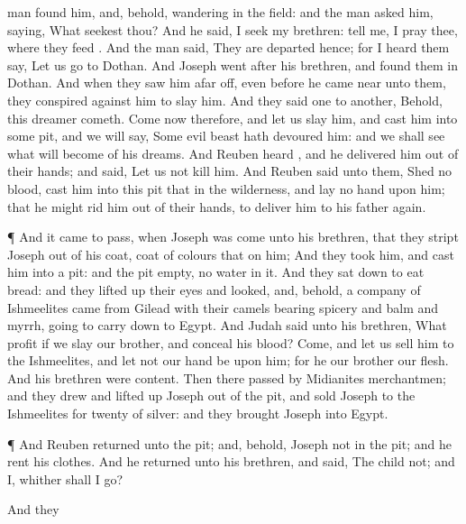 {man found
him, and, behold,
{}
wandering in the
field: and the
man asked
him,
saying, What
seekest thou?
And he
said, I
seek my
brethren:
tell me, I pray thee,
where they
feed
{}.
And the
man
said, They are
departed
hence; for I
heard them
say, Let us
go to
Dothan. And
Joseph
went
after his
brethren, and
found them in
Dothan.
And when they
saw him afar
off, even before he came
near unto them, they
conspired against him to
slay him.
And they
said
one to
another, Behold,
this
dreamer
cometh.
Come now therefore, and let us
slay him, and
cast him into
some
pit, and we will
say, Some
evil
beast hath
devoured him: and we shall
see what will become of his
dreams.
And
Reuben
heard
{}, and he
delivered him out of their
hands; and
said, Let us not
kill him.
And
Reuben
said unto them,
Shed no
blood,
{}
cast him into this
pit that
{} in the
wilderness, and
lay no
hand upon him; that he might
rid him out of their
hands, to
deliver him to his
father
again.
\par }{\PP {}¶ And it came to pass, when
Joseph was
come unto his
brethren, that they
stript
Joseph out
of his
coat,
{}
coat of
{}
colours that
{} on him;
And they
took him, and
cast him into a
pit: and the
pit
{}
empty,
{} no
water in it.
And they sat
down to
eat
bread: and they lifted
up their
eyes and
looked, and, behold, a
company of
Ishmeelites
came from
Gilead with their
camels
bearing
spicery and
balm and
myrrh,
going to carry
{}
down to
Egypt.
And
Judah
said unto his
brethren, What
profit
{} if we
slay our
brother, and
conceal his
blood?
Come, and let us
sell him to the
Ishmeelites, and let not our
hand be upon him; for he
{} our
brother
{} our
flesh. And his
brethren were
content.
Then there
passed by
Midianites
merchantmen; and they
drew and lifted
up
Joseph out of the
pit, and
sold
Joseph to the
Ishmeelites for
twenty
{} of
silver: and they
brought
Joseph into
Egypt.
\par }{\PP {}¶ And
Reuben
returned unto the
pit; and, behold,
Joseph
{} not in the
pit; and he
rent his
clothes.
And he
returned unto his
brethren, and
said, The
child
{} not; and I,
whither shall I
go?
\par }{\PP {}And they
}
